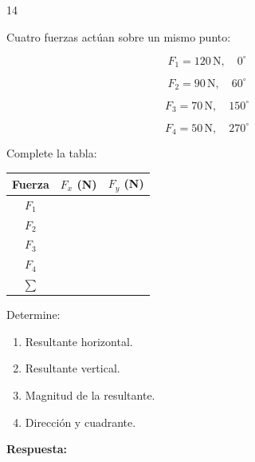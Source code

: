 \documentclass[11pt,letterpaper]{article}
\newcommand{\respuesta}{
\vspace{0.3cm}
\textcolor{morado}{\textbf{Respuesta:}}
\hrulefill
\vspace{0.3cm}
}
\newcommand{\espacio}[1]{
\vspace{#1}
}
\begin{document}
\newpage

\begin{ejercicio}{14}

Cuatro fuerzas actúan sobre
un mismo punto:

\[
F_1=120\,\mathrm{N},\quad 0^\circ
\]

\[
F_2=90\,\mathrm{N},\quad 60^\circ
\]

\[
F_3=70\,\mathrm{N},\quad 150^\circ
\]

\[
F_4=50\,\mathrm{N},\quad 270^\circ
\]

Complete la tabla:

\begin{center}
\renewcommand{\arraystretch}{1.8}

\begin{tabular}{|c|c|c|}
\hline
Fuerza & $F_x$ (N) & $F_y$ (N)\\
\hline
$F_1$ & &\\
\hline
$F_2$ & &\\
\hline
$F_3$ & &\\
\hline
$F_4$ & &\\
\hline
$\sum$ & &\\
\hline
\end{tabular}
\end{center}

Determine:

\begin{enumerate}[label=\alph*)]
\item Resultante horizontal.
\item Resultante vertical.
\item Magnitud de la resultante.
\item Dirección y cuadrante.
\end{enumerate}

\espacio{3cm}

\respuesta

\end{ejercicio}

\newpage
\end{document}
